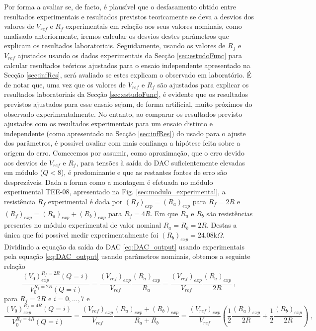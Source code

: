 \documentclass[a4paper, oneside]{article}
\begin{document}
Por forma a avaliar se, de facto, é plausível que o desfasamento obtido entre resultados experimentais e resultados previstos teoricamente se deva a desvios dos valores de $V_{ref}$ e $R_f$ experimentais em relação aos seus valores nominais, como analisado anteriormente, iremos calcular os desvios destes parâmetros que explicam os resultados laboratoriais. Seguidamente, usando os valores de $R_f$ e $V_{ref}$ ajustados usando os dados experimentais da Secção \ref{sec:estudoFunc} para calcular resultados teóricos ajustados para o ensaio independente apresentado na Secção \ref{sec:infRes}, será avaliado se estes explicam o observado em laboratório. É de notar que, uma vez que os valores de $V_{ref}$ e $R_f$ são ajustados para explicar os resultados laboratoriais da Secção \ref{sec:estudoFunc}, é evidente que os resultados previstos ajustados para esse ensaio sejam, de forma artificial, muito próximos do observado experimentalmente. No entanto, ao comparar os resultados previsto ajustados com os resultados experimentais para um ensaio distinto e independente (como apresentado na Secção \ref{sec:infRes}) do usado para o ajuste dos parâmetros, é possível avaliar com mais confiança a hipótese feita sobre a origem do erro. Comecemos por assumir, como aproximação, que o erro devido aos desvios de $V_{ref}$ e $R_f$, para tensões à saída do DAC suficientemente elevadas em módulo ($Q<8$), é predominante e que as restantes fontes de erro são desprezáveis. Dada a forma como a montagem é efetuada no módulo experimental TEE-08, apresentado na Fig. \ref{sec:modulo_experimental}, a resistência $R_f$ experimental é dada por $(R_f)_{exp} = (R_a)_{exp}$ para $R_f = 2R$ e $(R_f)_{exp} = (R_a)_{exp}+(R_b)_{exp}$ para $R_f = 4R$. Em que $R_a$ e $R_b$ são resistências presentes no módulo experimental de valor nominal $R_a = R_b=2R$. Destas a única que foi possível medir experimentalmente foi $(R_b)_{exp} = 24.08\text{k}\Omega$. Dividindo a equação da saída do DAC \eqref{eq:DAC_output} usando experimentais pela equação \eqref{eq:DAC_output} usando parâmetros nominais, obtemos a seguinte relação 
\begin{equation}\label{eq:ajusteRf}
\frac{(V_0)_{exp}^{R_f = 2R}(Q = i)}{V_0^{R_f = 2R}(Q = i)} = \frac{(V_{ref})_{exp}}{V_{ref}}\frac{(R_a)_{exp}}{R_a} = \frac{(V_{ref})_{exp}}{V_{ref}}\frac{(R_a)_{exp}}{2R} \:,
\end{equation}
para $R_f = 2R$ e $i = 0, \dots, 7$ e
\begin{equation}\label{eq:ajusteRf2}
\frac{(V_0)_{exp}^{R_f = 4R}(Q = i)}{V_0^{R_f = 4R}(Q = i)} = \frac{(V_{ref})_{exp}}{V_{ref}}\frac{(R_a)_{exp}+(R_b)_{exp}}{R_a+R_b} = \frac{(V_{ref})_{exp}}{V_{ref}}\left(\frac{1}{2}\frac{(R_a)_{exp}}{2R}+\frac{1}{2}\frac{(R_b)_{exp}}{2R}\right)\:,
\end{equation}
\end{document}
